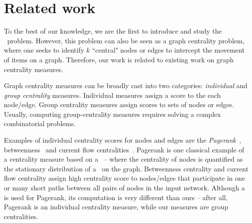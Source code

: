 \section{Related work}

To the best of our knowledge, we are the first to introduce and study the
 \mcproblem\ problem. However, this problem can also be seen as 
 a graph centrality problem, where one seeks to 
identify $k$ ``central" nodes or edges to
intercept the movement of items on a graph. Therefore, our work is related
to existing work on graph centrality measures.

Graph centrality measures can be broadly cast into two categories: \emph{individual}
and \emph{group centrality} measures. Individual measures assign 
a score to the each node/edge. %
Group centrality measures assign scores to sets of nodes or edges. 
Usually, computing group-centrality measures requires solving a
complex combinatorial problems. %

Examples of individual centrality scores for nodes and edges are the 
\emph{Pagerank}~\cite{pagerank1999}, 
betweenness~\cite{brandes01faster,erdos15divide,riondato16fast} 
and current flow centralities~\cite{brandes05centrality}. 
Pagerank is one classical 
example of a centrality measure based on a \markovchain\
-- where the centrality of nodes is
quantified as the stationary distribution
of a \markovchain\ on the graph. 
Betweenness centrality and current flow centrality
assign high centrality score to nodes/edges that participate in one or many short
paths between all pairs of nodes in the input network. 
Although a {\markovchain} is used for Pagerank, its computation is very different 
than ours -- after all, Pagerank is an individual centrality measure, while our measures are group centralities.


